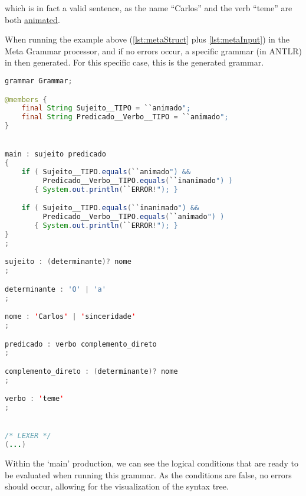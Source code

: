 \noindent which is in fact a valid sentence, as the name ``Carlos'' and the verb ``teme'' are both \underline{animated}.

When running the example above (\autoref{lst:metaStruct} plus \autoref{lst:metaInput}) in the Meta Grammar processor, and if no errors occur, a specific grammar (in ANTLR) 
in then generated. For this specific case, this is the generated grammar.

\begin{center}
\begin{minipage}{10cm}
\begin{lstlisting}[language=java, basicstyle=\tiny, label={lst:case_study_sentence}, caption=Example of a specific generated grammar.]
grammar Grammar;

@members {
    final String Sujeito__TIPO = ``animado";
    final String Predicado__Verbo__TIPO = ``animado";
}


main : sujeito predicado
{
    if ( Sujeito__TIPO.equals(``animado") &&
         Predicado__Verbo__TIPO.equals(``inanimado") ) 
       { System.out.println(``ERROR!"); }

    if ( Sujeito__TIPO.equals(``inanimado") &&
         Predicado__Verbo__TIPO.equals(``animado") ) 
       { System.out.println(``ERROR!"); }
}
;

sujeito : (determinante)? nome 
;

determinante : 'O' | 'a'
;

nome : 'Carlos' | 'sinceridade'
;

predicado : verbo complemento_direto 
;

complemento_direto : (determinante)? nome 
;

verbo : 'teme'
;


/* LEXER */
(...)
\end{lstlisting}
\end{minipage}
\end{center}

Within the ‘main’ production, we can see the logical conditions that are ready to be evaluated when running this grammar. As the conditions are false, no errors should occur,
allowing for the visualization of the syntax tree.


